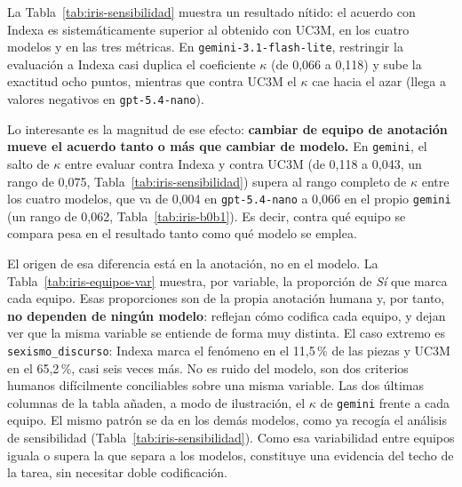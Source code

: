 La Tabla~\ref{tab:iris-sensibilidad} muestra un resultado nítido: el acuerdo con
Indexa es sistemáticamente superior al obtenido con UC3M, en los cuatro modelos y en
las tres métricas. En \texttt{gemini-3.1-flash-lite}, restringir la evaluación a
Indexa casi duplica el coeficiente $\kappa$ (de 0,066 a 0,118) y sube la exactitud
ocho puntos, mientras que contra UC3M el $\kappa$ cae hacia el azar (llega a valores
negativos en \texttt{gpt-5.4-nano}).

Lo interesante es la magnitud de ese efecto: \textbf{cambiar de equipo de anotación
mueve el acuerdo tanto o más que cambiar de modelo.} En \texttt{gemini}, el salto de
$\kappa$ entre evaluar contra Indexa y contra UC3M (de 0,118 a 0,043, un rango de
0,075, Tabla~\ref{tab:iris-sensibilidad}) supera al rango completo de $\kappa$ entre
los cuatro modelos, que va de 0,004 en \texttt{gpt-5.4-nano} a 0,066 en el propio
\texttt{gemini} (un rango de 0,062, Tabla~\ref{tab:iris-b0b1}). Es decir, contra qué
equipo se compara pesa en el resultado tanto como qué modelo se emplea.


El origen de esa diferencia está en la anotación, no en el modelo. La
Tabla~\ref{tab:iris-equipos-var} muestra, por variable, la proporción de \textit{Sí}
que marca cada equipo. Esas proporciones son de la propia anotación humana y, por
tanto, \textbf{no dependen de ningún modelo}: reflejan cómo codifica cada equipo, y
dejan ver que la misma variable se entiende de forma muy distinta. El caso extremo es
\texttt{sexismo\_discurso}: Indexa marca el fenómeno en el 11,5\,\% de las piezas y
UC3M en el 65,2\,\%, casi seis veces más. No es ruido del modelo, son dos criterios
humanos difícilmente conciliables sobre una misma variable. Las dos últimas columnas
de la tabla añaden, a modo de ilustración, el $\kappa$ de \texttt{gemini} frente a
cada equipo. El mismo patrón se da en los demás modelos, como ya recogía el análisis
de sensibilidad (Tabla~\ref{tab:iris-sensibilidad}).
Como esa variabilidad entre equipos iguala o supera la que separa a los modelos,
constituye una evidencia del techo de la tarea, sin necesitar doble codificación.


